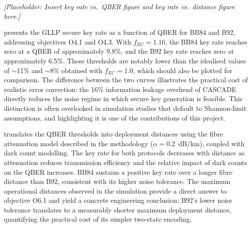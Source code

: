 \documentclass[10pt, a4paper]{report}
\begin{document}

\textit{[Placeholder: Insert key rate vs.\ QBER figure and key rate vs.\ distance figure here.]}

 presents the GLLP secure key rate as a function of QBER for BB84 and B92, addressing objectives O4.1 and O4.3. With $f_{EC} = 1.16$, the BB84 key rate reaches zero at a QBER of approximately 9.8\%, and the B92 key rate reaches zero at approximately 6.5\%. These thresholds are notably lower than the idealised values of $\sim$11\% and $\sim$8\% obtained with $f_{EC} = 1.0$, which should also be plotted for comparison. The difference between the two curves illustrates the practical cost of realistic error correction: the 16\% information leakage overhead of CASCADE directly reduces the noise regime in which secure key generation is feasible. This distinction is often overlooked in simulation studies that default to Shannon-limit assumptions, and highlighting it is one of the contributions of this project.

 translates the QBER thresholds into deployment distances using the fibre attenuation model described in the methodology ($\alpha = 0.2$~dB/km), coupled with dark count modelling. The key rate for both protocols decreases with distance as attenuation reduces transmission efficiency and the relative impact of dark counts on the QBER increases. BB84 sustains a positive key rate over a longer fibre distance than B92, consistent with its higher noise tolerance. The maximum operational distances observed in the simulation provide a direct answer to objective O6.1 and yield a concrete engineering conclusion: B92's lower noise tolerance translates to a measurably shorter maximum deployment distance, quantifying the practical cost of its simpler two-state encoding.



\end{document}

